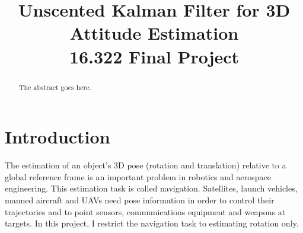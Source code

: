 \documentclass[conference]{IEEEtran}
\begin{document}
%
\title{Unscented Kalman Filter for 3D Attitude Estimation\\16.322 Final Project}


\author{
}


\maketitle

\begin{abstract}
The abstract goes here.
\end{abstract}





%
\IEEEpeerreviewmaketitle



\section{Introduction}
The estimation of an object's 3D pose (rotation and translation) relative to a global reference frame is an important problem in robotics and aerospace engineering. This estimation task is called navigation. Satellites, launch vehicles, manned aircraft and UAVs need pose information in order to control their trajectories and to point sensors, communications equipment and weapons at targets. In this project, I restrict the navigation task to estimating rotation only.\\
\end{document}
